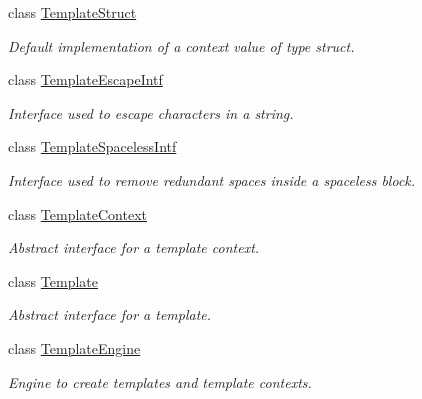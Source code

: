 \begin{DoxyCompactItemize}
class \hyperlink{class_template_struct}{Template\+Struct}
\begin{DoxyCompactList}\small\item\em Default implementation of a context value of type struct. \end{DoxyCompactList}\item 
class \hyperlink{class_template_escape_intf}{Template\+Escape\+Intf}
\begin{DoxyCompactList}\small\item\em Interface used to escape characters in a string. \end{DoxyCompactList}\item 
class \hyperlink{class_template_spaceless_intf}{Template\+Spaceless\+Intf}
\begin{DoxyCompactList}\small\item\em Interface used to remove redundant spaces inside a spaceless block. \end{DoxyCompactList}\item 
class \hyperlink{class_template_context}{Template\+Context}
\begin{DoxyCompactList}\small\item\em Abstract interface for a template context. \end{DoxyCompactList}\item 
class \hyperlink{class_template}{Template}
\begin{DoxyCompactList}\small\item\em Abstract interface for a template. \end{DoxyCompactList}\item 
class \hyperlink{class_template_engine}{Template\+Engine}
\begin{DoxyCompactList}\small\item\em Engine to create templates and template contexts. \end{DoxyCompactList}\end{DoxyCompactItemize}
